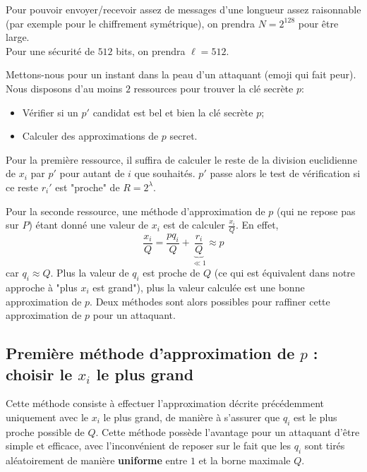\documentclass{article}
\begin{document}
Pour pouvoir envoyer/recevoir assez de messages d'une longueur assez raisonnable (par exemple pour le chiffrement symétrique), on prendra $N = 2^{128}$ pour être large.\\
Pour une sécurité de $512$ bits, on prendra $\ell = 512$.

Mettons-nous pour un instant dans la peau d'un attaquant (emoji qui fait peur). Nous disposons d'au moins $2$ ressources pour trouver la clé secrète $p$:
\begin{itemize}
    \item Vérifier si un $p'$ candidat est bel et bien la clé secrète $p$;
    \item Calculer des approximations de $p$ secret.
\end{itemize}

Pour la première ressource, il suffira de calculer le reste de la division euclidienne de $x_i$ par $p'$ pour autant de $i$ que souhaités. $p'$ passe alors le test de vérification si ce reste $r_i'$ est "proche" de $R = 2^\lambda$.

Pour la seconde ressource, une méthode d'approximation de $p$ (qui ne repose pas sur $P$) étant donné une valeur de $x_i$ est de calculer $\displaystyle \frac{x_i}{Q}$. En effet, \[\frac{x_i}{Q}= \frac{pq_i}{Q} + \underbrace{\frac{r_i}{Q}}_{\ll 1} \approx p\] car $q_i \approx Q$. Plus la valeur de $q_i$ est proche de $Q$ (ce qui est équivalent dans notre approche à "plus $x_i$ est grand"), plus la valeur calculée est une bonne approximation de $p$. Deux méthodes sont alors possibles pour raffiner cette approximation de $p$ pour un attaquant.

\subsection{Première méthode d'approximation de $p$ : choisir le $x_i$ le plus grand}

Cette méthode consiste à effectuer l'approximation décrite précédemment uniquement avec le $x_i$ le plus grand, de manière à s'assurer que $q_i$ est le plus proche possible de $Q$. Cette méthode possède l'avantage pour un attaquant d'être simple et efficace, avec l'inconvénient de reposer sur le fait que les $q_i$ sont tirés aléatoirement de manière \textbf{uniforme} entre $1$ et la borne maximale $Q$.\\
\end{document}
